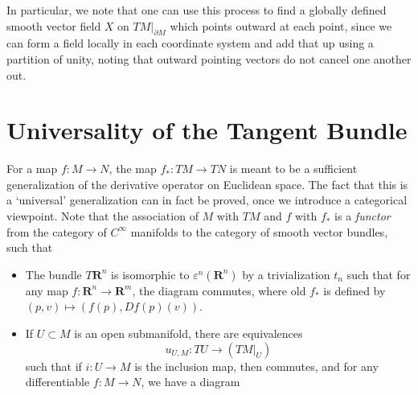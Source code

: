 \begin{remark}
    In particular, we note that one can use this process to find a globally defined smooth vector field $X$ on $TM|_{\partial M}$ which points outward at each point, since we can form a field locally in each coordinate system and add that up using a partition of unity, noting that outward pointing vectors do not cancel one another out.
\end{remark}

\section{Universality of the Tangent Bundle}

For a map $f:M \to N$, the map $f_*: TM \to TN$ is meant to be a sufficient generalization of the derivative operator on Euclidean space. The fact that this is a `universal' generalization can in fact be proved, once we introduce a categorical viewpoint. Note that the association of $M$ with $TM$ and $f$ with $f_*$ is a {\it functor} from the category of $C^\infty$ manifolds to the category of smooth vector bundles, such that
%
\begin{itemize}
    \item The bundle $T\mathbf{R}^n$ is isomorphic to $\varepsilon^n(\mathbf{R}^n)$ by a trivialization $t_n$ such that for any map $f: \mathbf{R}^n \to \mathbf{R}^m$, the diagram
    commutes, where $\text{old $f_*$}$ is defined by $(p,v) \mapsto (f(p), Df(p)(v))$.
    \item If $U \subset M$ is an open submanifold, there are equivalences
    \[ u_{U,M}: TU \to (TM|_U) \]
    such that if $i: U \to M$ is the inclusion map, then
    commutes, and for any differentiable $f:M \to N$, we have a diagram
\end{itemize}

